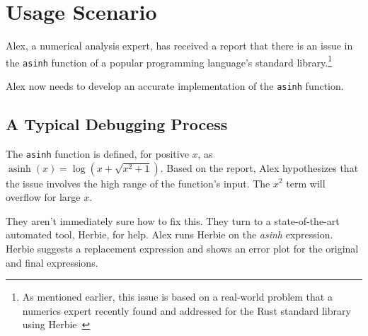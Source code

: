 
\section{Usage Scenario}

Alex, a numerical analysis expert, 
  has received a report that there is an issue in 
  the \texttt{asinh} function of a popular programming language's standard library.\footnote{As mentioned earlier, this issue is based on a
  real-world problem that a numerics expert recently found and addressed for
  the Rust standard library using Herbie~\cite{herbie-rust}}

Alex now needs to develop
  an accurate implementation of the \texttt{asinh} function.

\subsection{A Typical Debugging Process}
The \texttt{asinh} function is defined, for positive $x$, as
  $\operatorname{asinh}(x) = \log(x + \sqrt{x^2 + 1})$.
Based on the report, 
  Alex hypothesizes that the issue involves
  the high range of the function's input.
The $x^2$ term will overflow for large $x$.

They aren't immediately sure how to fix this.
They turn to a state-of-the-art automated tool,
  Herbie, for help.
Alex runs Herbie on the \textit{asinh} expression.
Herbie suggests a replacement expression
  and shows an error plot 
  for the original and final expressions.
  

